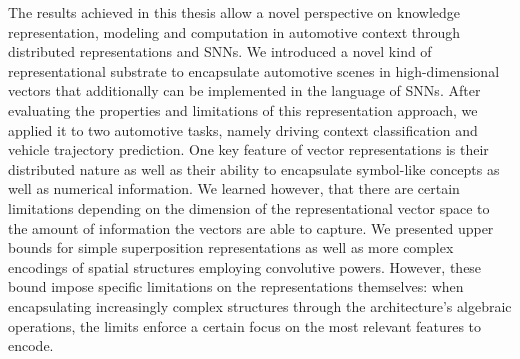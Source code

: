 The results achieved in this thesis allow a novel perspective on knowledge representation, modeling and computation in automotive context through distributed representations and \acp{SNN}.
We introduced a novel kind of representational substrate to encapsulate automotive scenes in high-dimensional vectors that additionally can be implemented in the language of \acp{SNN}.
After evaluating the properties and limitations of this representation approach, we applied it to two automotive tasks, namely driving context classification and vehicle trajectory prediction.
One key feature of vector representations is their distributed nature as well as their ability to encapsulate symbol-like concepts as well as numerical information.
We learned however, that there are certain limitations depending on the dimension of the representational vector space to the amount of information the vectors are able to capture.
We presented upper bounds for simple superposition representations as well as more complex encodings of spatial structures employing convolutive powers.
However, these bound impose specific limitations on the representations themselves: when encapsulating increasingly complex structures through the architecture's algebraic operations, the limits enforce a certain focus on the most relevant features to encode.

